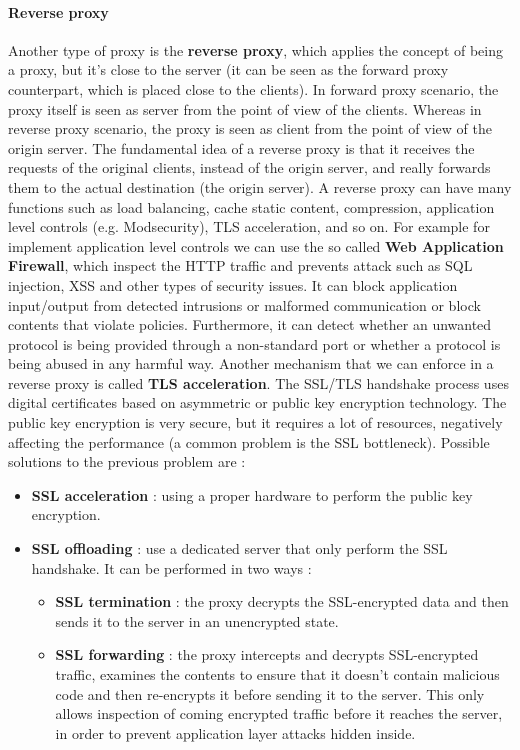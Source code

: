 \documentclass[11pt]{article}
\begin{document}
\paragraph{Reverse proxy} Another type of proxy is the \textbf{reverse proxy}, which applies the concept of being a proxy, but it's close to the server (it can be seen as the forward proxy counterpart, which is placed close to the clients). In forward proxy scenario, the proxy itself is seen as server from the point of view of the clients. Whereas in reverse proxy scenario, the proxy is seen as client from the point of view of the origin server. The fundamental idea of a reverse proxy is that it receives the requests of the original clients, instead of the origin server, and really forwards them to the actual destination (the origin server). A reverse proxy can have many functions such as load balancing, cache static content, compression, application level controls (e.g. Modsecurity), TLS acceleration, and so on. For example for implement application level controls we can use the so called \textbf{Web Application Firewall}, which inspect the HTTP traffic and prevents attack such as SQL injection, XSS and other types of security issues. It can block application input/output from detected intrusions or malformed communication or block contents that violate policies. Furthermore, it can detect whether an unwanted protocol is being provided through a non-standard port or whether a protocol is being abused in any harmful way. Another mechanism that we can enforce in a reverse proxy is called \textbf{TLS acceleration}. The SSL/TLS handshake process uses digital certificates based on asymmetric or public key encryption technology. The public key encryption is very secure, but it requires a lot of resources, negatively affecting the performance (a common problem is the SSL bottleneck). Possible solutions to the previous problem are : 
\begin{itemize}
\item \textbf{SSL acceleration} : using a proper hardware to perform the public key encryption.
\item \textbf{SSL offloading} : use a dedicated server that only perform the SSL handshake. It can be performed in two ways : 
\begin{itemize}
\item \textbf{SSL termination} : the proxy decrypts the SSL-encrypted data and then sends it to the server in an unencrypted state.
\item \textbf{SSL forwarding} : the proxy intercepts and decrypts SSL-encrypted traffic, examines the contents to ensure that it doesn't contain malicious code and then re-encrypts it before sending it to the server. This only allows inspection of coming encrypted traffic before it reaches the server, in order to prevent application layer attacks hidden inside.
\end{itemize}
\end{itemize}
\end{document}
